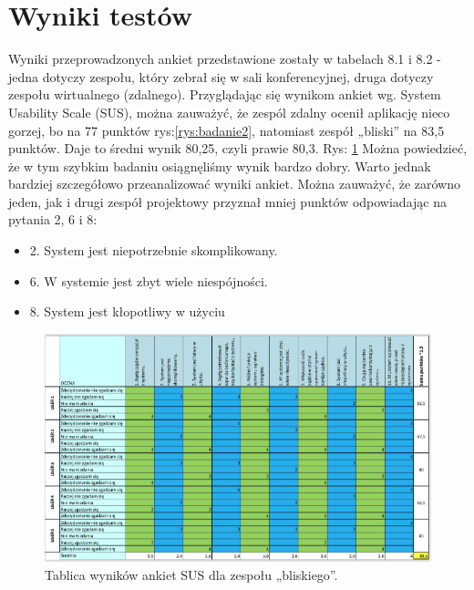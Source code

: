 \section{Wyniki testów}
Wyniki przeprowadzonych ankiet przedstawione zostały w tabelach 8.1 i 8.2 - jedna dotyczy zespołu,
który zebrał się w sali konferencyjnej, druga dotyczy zespołu wirtualnego (zdalnego).
Przyglądając się wynikom ankiet wg. System Usability Scale (SUS), można zauważyć, że zespól zdalny
ocenił aplikację nieco gorzej, bo na 77 punktów rys:\ref{rys:badanie2}, natomiast zespół „bliski” na 83,5 punktów. Daje to
średni wynik 80,25, czyli prawie 80,3. Rys: \ref{rys:badanie1}
Można powiedzieć, że w tym szybkim badaniu osiągnęliśmy wynik bardzo dobry. Warto jednak
bardziej szczegółowo przeanalizować wyniki ankiet. Można zauważyć, że zarówno jeden, jak i drugi
zespół projektowy przyznał mniej punktów odpowiadając na pytania 2, 6 i 8:
\begin{itemize}
	\item 2. System jest niepotrzebnie skomplikowany.
	\item 6. W systemie jest zbyt wiele niespójności.
	\item 8. System jest kłopotliwy w użyciu
\end{itemize} 

\begin{figure}[H]
	\centering\includegraphics[width=\textwidth]{img/Badanie1.png}
	\caption{Tablica wyników ankiet SUS dla zespołu „bliskiego”.}\label{rys:badanie1}%
\end{figure}

